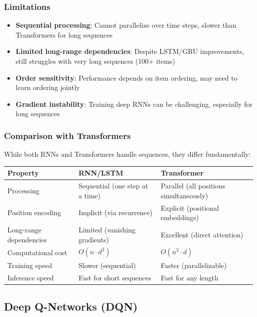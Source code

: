 \subsubsection{Limitations}

\begin{itemize}
\item \textbf{Sequential processing}: Cannot parallelize over time steps, slower than Transformers for long sequences
\item \textbf{Limited long-range dependencies}: Despite LSTM/GRU improvements, still struggles with very long sequences (100+ items)
\item \textbf{Order sensitivity}: Performance depends on item ordering, may need to learn ordering jointly
\item \textbf{Gradient instability}: Training deep RNNs can be challenging, especially for long sequences
\end{itemize}

\subsubsection{Comparison with Transformers}

While both RNNs and Transformers handle sequences, they differ fundamentally:

\begin{table}[h]
\centering
\begin{tabular}{|l|p{5.5cm}|p{5.5cm}|}
\hline
\textbf{Property} & \textbf{RNN/LSTM} & \textbf{Transformer} \\
\hline
Processing & Sequential (one step at a time) & Parallel (all positions simultaneously) \\
\hline
Position encoding & Implicit (via recurrence) & Explicit (positional embeddings) \\
\hline
Long-range dependencies & Limited (vanishing gradients) & Excellent (direct attention) \\
\hline
Computational cost & $O(n \cdot d^2)$ & $O(n^2 \cdot d)$ \\
\hline
Training speed & Slower (sequential) & Faster (parallelizable) \\
\hline
Inference speed & Fast for short sequences & Fast for any length \\
\hline
\end{tabular}
\end{table}


\subsection{Deep Q-Networks (DQN)}

